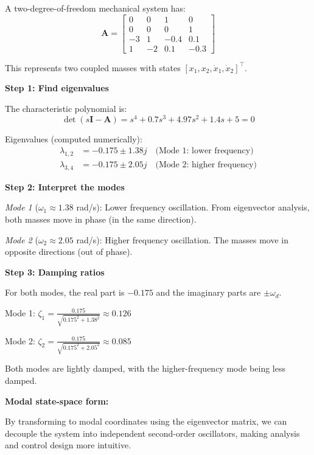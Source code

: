 \begin{example}
\label{ex:modal_analysis}
A two-degree-of-freedom mechanical system has:
\begin{equation}
\mathbf{A} = \begin{bmatrix} 0 & 0 & 1 & 0 \\ 0 & 0 & 0 & 1 \\ -3 & 1 & -0.4 & 0.1 \\ 1 & -2 & 0.1 & -0.3 \end{bmatrix}
\end{equation}

This represents two coupled masses with states $[x_1, x_2, \dot{x}_1, \dot{x}_2]^\top$.

\textbf{Step 1: Find eigenvalues}

The characteristic polynomial is:
\begin{equation}
\det(s\mathbf{I} - \mathbf{A}) = s^4 + 0.7s^3 + 4.97s^2 + 1.4s + 5 = 0
\end{equation}

Eigenvalues (computed numerically):
\begin{align}
\lambda_{1,2} &= -0.175 \pm 1.38j \quad \text{(Mode 1: lower frequency)} \\
\lambda_{3,4} &= -0.175 \pm 2.05j \quad \text{(Mode 2: higher frequency)}
\end{align}

\textbf{Step 2: Interpret the modes}

\textit{Mode 1} ($\omega_1 \approx 1.38$ rad/s): Lower frequency oscillation. From eigenvector analysis, both masses move in phase (in the same direction).

\textit{Mode 2} ($\omega_2 \approx 2.05$ rad/s): Higher frequency oscillation. The masses move in opposite directions (out of phase).

\textbf{Step 3: Damping ratios}

For both modes, the real part is $-0.175$ and the imaginary parts are $\pm\omega_d$.

Mode 1: $\zeta_1 = \frac{0.175}{\sqrt{0.175^2 + 1.38^2}} \approx 0.126$

Mode 2: $\zeta_2 = \frac{0.175}{\sqrt{0.175^2 + 2.05^2}} \approx 0.085$

Both modes are lightly damped, with the higher-frequency mode being less damped.

\textbf{Modal state-space form:}

By transforming to modal coordinates using the eigenvector matrix, we can decouple the system into independent second-order oscillators, making analysis and control design more intuitive.
\end{example}

